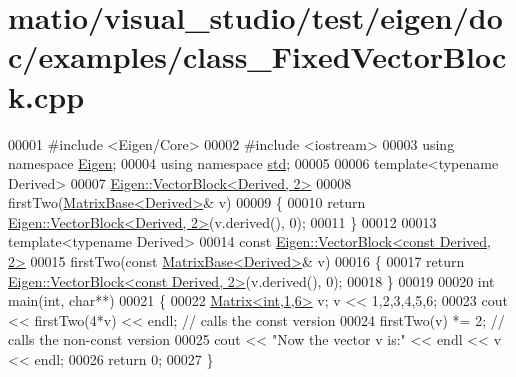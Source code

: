 \hypertarget{matio_2visual__studio_2test_2eigen_2doc_2examples_2class___fixed_vector_block_8cpp_source}{}\section{matio/visual\+\_\+studio/test/eigen/doc/examples/class\+\_\+\+Fixed\+Vector\+Block.cpp}
\label{matio_2visual__studio_2test_2eigen_2doc_2examples_2class___fixed_vector_block_8cpp_source}

\begin{DoxyCode}
00001 \textcolor{preprocessor}{#include <Eigen/Core>}
00002 \textcolor{preprocessor}{#include <iostream>}
00003 \textcolor{keyword}{using namespace }\hyperlink{namespace_eigen}{Eigen};
00004 \textcolor{keyword}{using namespace }\hyperlink{namespacestd}{std};
00005 
00006 \textcolor{keyword}{template}<\textcolor{keyword}{typename} Derived>
00007 \hyperlink{group___core___module_class_eigen_1_1_vector_block}{Eigen::VectorBlock<Derived, 2>}
00008 firstTwo(\hyperlink{group___core___module_class_eigen_1_1_matrix_base}{MatrixBase<Derived>}& v)
00009 \{
00010   \textcolor{keywordflow}{return} \hyperlink{group___core___module_class_eigen_1_1_vector_block}{Eigen::VectorBlock<Derived, 2>}(v.derived(), 0);
00011 \}
00012 
00013 \textcolor{keyword}{template}<\textcolor{keyword}{typename} Derived>
00014 \textcolor{keyword}{const} \hyperlink{group___core___module_class_eigen_1_1_vector_block}{Eigen::VectorBlock<const Derived, 2>}
00015 firstTwo(\textcolor{keyword}{const} \hyperlink{group___core___module_class_eigen_1_1_matrix_base}{MatrixBase<Derived>}& v)
00016 \{
00017   \textcolor{keywordflow}{return} \hyperlink{group___core___module_class_eigen_1_1_vector_block}{Eigen::VectorBlock<const Derived, 2>}(v.derived(), 0);
00018 \}
00019 
00020 \textcolor{keywordtype}{int} main(\textcolor{keywordtype}{int}, \textcolor{keywordtype}{char}**)
00021 \{
00022   \hyperlink{group___core___module_class_eigen_1_1_matrix}{Matrix<int,1,6>} v; v << 1,2,3,4,5,6;
00023   cout << firstTwo(4*v) << endl; \textcolor{comment}{// calls the const version}
00024   firstTwo(v) *= 2;              \textcolor{comment}{// calls the non-const version}
00025   cout << \textcolor{stringliteral}{"Now the vector v is:"} << endl << v << endl;
00026   \textcolor{keywordflow}{return} 0;
00027 \}
\end{DoxyCode}
